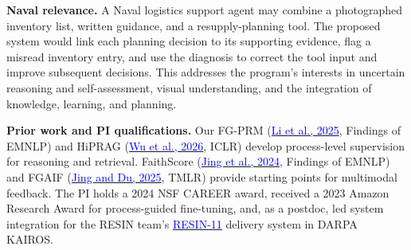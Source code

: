 \documentclass[11pt,letterpaper]{article}
\newcommand{\head}[1]{\textbf{#1}\enspace}
\begin{document}
\par\head{Naval relevance.} A Naval logistics support agent may combine a photographed inventory list, written guidance, and a resupply-planning tool. The proposed system would link each planning decision to its supporting evidence, flag a misread inventory entry, and use the diagnosis to correct the tool input and improve subsequent decisions. This addresses the program's interests in uncertain reasoning and self-assessment, visual understanding, and the integration of knowledge, learning, and planning.
\par\head{Prior work and PI qualifications.} Our FG-PRM (\href{https://doi.org/10.18653/v1/2025.findings-emnlp.228}{\textcolor{blue}{Li et al., 2025}}, Findings of EMNLP) and HiPRAG (\href{https://arxiv.org/abs/2510.07794}{\textcolor{blue}{Wu et al., 2026}}, ICLR) develop process-level supervision for reasoning and retrieval. FaithScore (\href{https://aclanthology.org/2024.findings-emnlp.290/}{\textcolor{blue}{Jing et al., 2024}}, Findings of EMNLP) and FGAIF (\href{https://openreview.net/forum?id=Qhfw5CUVd7}{\textcolor{blue}{Jing and Du, 2025}}, TMLR) provide starting points for multimodal feedback. The PI holds a 2024 NSF CAREER award, received a 2023 Amazon Research Award for process-guided fine-tuning, and, as a postdoc, led system integration for the RESIN team's \href{https://doi.org/10.18653/v1/2022.naacl-demo.7}{\textcolor{blue}{RESIN-11}} delivery system in DARPA KAIROS.
\end{document}

